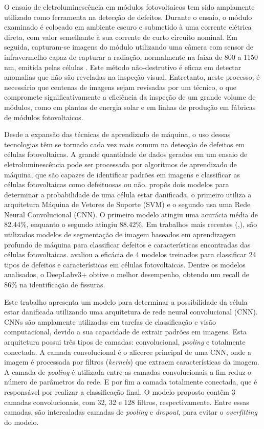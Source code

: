 \documentclass[conference]{IEEEtran}
\begin{document}
O ensaio de eletroluminescência em módulos fotovoltaicos tem sido amplamente
utilizado como ferramenta na detecção de
defeitos. Durante o ensaio, o módulo examinado é colocado em ambiente escuro e
submetido à uma corrente elétrica direta, com valor semelhante à sua corrente
de curto circuito nominal.  Em seguida, capturam-se imagens do módulo
utilizando uma câmera com sensor de infravermelho capaz de capturar a radiação,
normalmente na faixa de 800 a 1150 nm, emitida pelas células
\cite{Frazao20177}. Este método não-destrutivo é eficaz em detectar anomalias
que não são reveladas na inspeção visual. Entretanto, neste processo,
é necessário que centenas de imagens sejam revisadas por um técnico, o que
compromete significativamente a eficiência da inspeção de um grande volume de
módulos, como em plantas de energia solar e em linhas de produção em fábricas
de módulos fotovoltaicos.

Desde a expansão das técnicas de aprendizado de máquina, o uso dessas
tecnologias têm se tornado cada vez mais comum na detecção de defeitos em
células fotovoltaicas. A grande quantidade de dados gerados em um ensaio de
eletroluminescência pode ser processada por algoritmos de aprendizado de
máquina, que são capazes de identificar padrões em imagens e classificar as
células fotovoltaicas como defeituosas ou não. \cite{Pratt2023} propôs
dois modelos
para determinar a probabilidade de uma célula estar danificada, o primeiro
utiliza a arquitetura
Máquina de Vetores de Suporte (SVM) e o segundo usa uma Rede Neural
Convolucional (CNN). O primeiro modelo atingiu uma acurácia média de 82.44\%,
enquanto o segundo atingiu 88.42\%. Em trabalhos mais recentes
(\cite{Pratt2023},\cite{Pratt2021}), são
utilizados modelos de segmentação de imagem baseados em aprendizagem profundo
de máquina para classificar defeitos e características encontradas das células
fotovoltaicas.\cite{Pratt2023} avaliou a eficácia de 4 modelos treinados para
classificar
24 tipos de defeitos e características em células fotovoltaicas.
Dentre os modelos analisados, o DeepLabv3+ obtive o melhor
desempenho, obtendo um recall de 86\% na identificação de fissuras.

Este trabalho apresenta um modelo para determinar a
possibilidade da célula estar danificada utilizando uma arquitetura de rede
neural convolucional (CNN). CNNs são amplamente utilizadas em tarefas de
classificação e visão computacional, devido a sua capacidade de extrair padrões
em imagens. Esta arquitetura possui três tipos de camadas:
convolucional, \textit{pooling} e totalmente conectada. A camada convolucional
é o alicerce principal de uma CNN, onde a imagem é processada por filtros
(\textit{kernels}) que
extraem características da imagem. A camada de \textit{pooling} é utilizada
entre as camadas convolucionais a fim reduz o número de parâmetros da rede. E
por fim a camada totalmente conectada, que é responsável por realizar a
classificação final. O modelo proposto contêm 3 camadas convolucionais, com 32,
32 e 128 filtros, respectivamente. Entre essas camadas, são intercaladas
camadas de
\textit{pooling} e \textit{dropout}, para evitar o \textit{overfitting} do
modelo.
\end{document}

